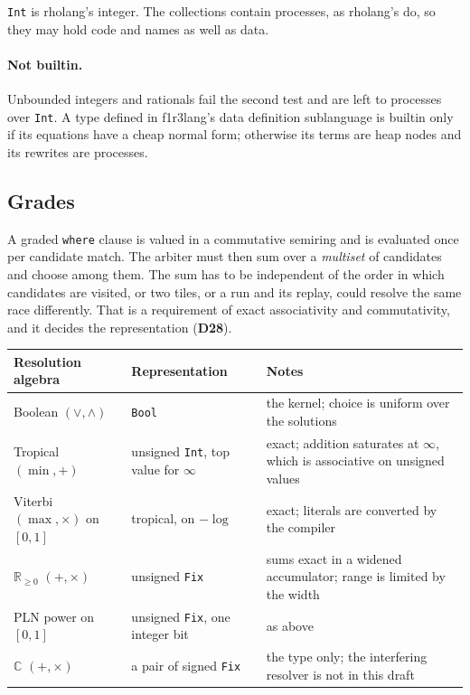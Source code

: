 \documentclass[11pt]{article}
\newcommand{\kw}[1]{\texttt{#1}}
\newcommand{\dec}[1]{\textbf{D#1}}
\theoremstyle{definition}
\theoremstyle{remark}
\begin{document}
\medskip\noindent
\kw{Int} is rholang's integer. The collections contain
processes, as rholang's do, so they may hold code and names as well as data.

\paragraph{Not builtin.} Unbounded integers and rationals fail the second
test and are left to processes over \kw{Int}. A type defined in f1r3lang's
data definition sublanguage is builtin only if its equations have a cheap
normal form; otherwise its terms are heap nodes and its rewrites are
processes.

\subsection{Grades}\label{sec:grades}

A graded \kw{where} clause is valued in a commutative semiring and is
evaluated once per candidate match. The arbiter must then sum over a
\emph{multiset} of candidates and choose among them. The sum has to be
independent of the order in which candidates are visited, or two tiles, or a
run and its replay, could resolve the same race differently. That is a
requirement of exact associativity and commutativity, and it decides the
representation (\dec{28}).

\medskip\noindent
\begin{tabularx}{\textwidth}{@{}l l X@{}}
\toprule
Resolution algebra & Representation & Notes\\
\midrule
Boolean $(\vee,\wedge)$ & \kw{Bool} & the kernel; choice is uniform over
  the solutions\\
Tropical $(\min,+)$ & unsigned \kw{Int}, top value for $\infty$ & exact;
  addition saturates at $\infty$, which is associative on unsigned values\\
Viterbi $(\max,\times)$ on $[0,1]$ & tropical, on $-\log$ & exact;
  literals are converted by the compiler\\
$\mathbb{R}_{\ge 0}$ $(+,\times)$ & unsigned \kw{Fix} & sums exact in a
  widened accumulator; range is limited by the width\\
PLN power on $[0,1]$ & unsigned \kw{Fix}, one integer bit & as above\\
$\mathbb{C}$ $(+,\times)$ & a pair of signed \kw{Fix} & the type only; the
  interfering resolver is not in this draft\\
\bottomrule
\end{tabularx}
\end{document}
